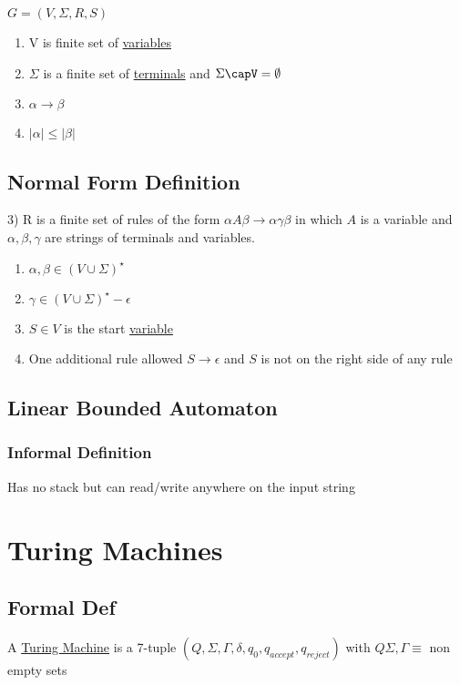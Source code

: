 \documentclass[11pt]{article}
\begin{document}
   $G=(V,\Sigma,R,S)$
\begin{enumerate}
\item V is finite set of \underline{variables}
\item $\Sigma$  is a finite set of \underline{terminals} and $\Sigma\capV=
      \emptyset$
\item $\alpha\rightarrow\beta$
\item $|\alpha|\leq|\beta|$
\end{enumerate}
\subsection{Normal Form Definition}
\label{sec-4.2}

   3) R is a finite set of rules of the form $\alpha A\beta
      \rightarrow\alpha\gamma\beta$ in which $A$ is a variable and
      $\alpha,\beta,\gamma$ are strings of terminals and variables.

\begin{enumerate}
\item $\alpha,\beta\in(V\cup\Sigma)^{\star}$
\item $\gamma\in(V\cup\Sigma)^{\star}-{\epsilon}$
\item $S\in V$ is the start \underline{variable}
\item One additional rule allowed $S\rightarrow \epsilon$ and $S$ is not on the right side of any rule
\end{enumerate}
\subsection{Linear Bounded Automaton}
\label{sec-4.3}

\subsubsection{Informal Definition}
\label{sec-4.3.1}

    Has no stack but can read/write anywhere on the input string
\section{Turing Machines}
\label{sec-5}

\subsection{Formal Def}
\label{sec-5.1}

   A \underline{Turing Machine} is a 7-tuple $(Q,\Sigma,\Gamma,\delta,q_0,
   q_{accept},q _{reject})$ with $Q\Sigma,\Gamma\equiv$ non empty sets
\end{document}
